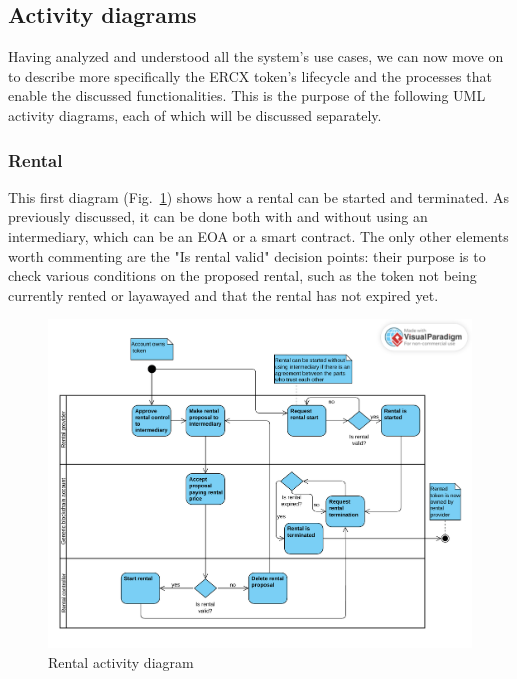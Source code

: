 \documentclass[english, LaM, oneside]{sapthesis}%
\begin{document}
\subsection{Activity diagrams}
Having analyzed and understood all the system's use cases, we can now move on to describe more specifically the ERCX token's lifecycle and the processes that enable the discussed functionalities. This is the purpose of the following UML activity diagrams, each of which will be discussed separately.

\subsubsection{Rental}

This first diagram (Fig.~\ref{fig:Rental AD}) shows how a rental can be started and terminated. As previously discussed, it can be done both with and without using an intermediary, which can be an EOA or a smart contract. The only other elements worth commenting are the "Is rental valid" decision points: their purpose is to check various conditions on the proposed rental, such as the token not being currently rented or layawayed and that the rental has not expired yet. 

\begin{figure}[H]
    \centering
        \begin{adjustbox}{width=1\textwidth}
            \includegraphics{ActivityDiagrams/activity_rental.pdf} 
        \end{adjustbox}
    \caption{Rental activity diagram}
    \label{fig:Rental AD}
\end{figure}
\end{document}
